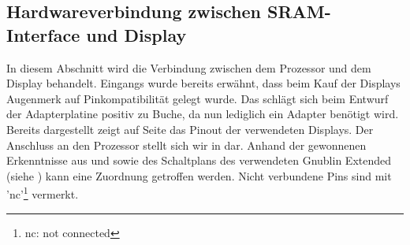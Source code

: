 \newpage
\subsection{Hardwareverbindung zwischen SRAM-Interface und Display}
In diesem Abschnitt wird die Verbindung zwischen dem Prozessor und dem Display behandelt. Eingangs wurde bereits erwähnt, dass beim Kauf der Displays Augenmerk auf Pinkompatibilität gelegt wurde. Das schlägt sich beim Entwurf der Adapterplatine positiv zu Buche, da nun lediglich ein Adapter benötigt wird. \newline
Bereits dargestellt zeigt  auf Seite \pageref{fig:8080_pinout} das Pinout der verwendeten Displays. Der Anschluss an den Prozessor stellt sich wir in  dar. Anhand der gewonnenen Erkenntnisse aus  und  sowie des Schaltplans des verwendeten Gnublin Extended (siehe \cite{EmbeddedProjects2013}) kann eine Zuordnung getroffen werden. Nicht verbundene Pins sind mit 'nc'\footnote{nc: not connected} vermerkt.


